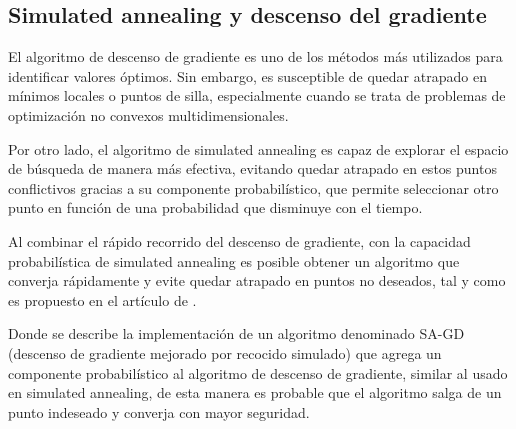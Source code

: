 \subsection{Simulated annealing y descenso del gradiente}

El algoritmo de descenso de gradiente es uno de los métodos más utilizados para identificar valores óptimos. Sin embargo, es susceptible de quedar atrapado en mínimos locales o puntos de silla, especialmente cuando se trata de problemas de optimización no convexos multidimensionales.

Por otro lado, el algoritmo de simulated annealing es capaz de explorar el espacio de búsqueda de manera más efectiva, evitando quedar atrapado en estos puntos conflictivos gracias a su componente probabilístico, que permite seleccionar otro punto en función de una probabilidad que disminuye con el tiempo. 

Al combinar el rápido recorrido del descenso de gradiente, con la capacidad probabilística de simulated annealing es posible obtener un algoritmo que converja rápidamente y evite quedar atrapado en puntos no deseados, tal y como es propuesto en el artículo de 
.


Donde se describe la implementación de un algoritmo denominado SA-GD (descenso de gradiente mejorado por recocido simulado) que agrega un componente probabilístico al algoritmo de descenso de gradiente, similar al usado en simulated annealing, de esta manera es probable que el algoritmo salga de un punto indeseado y converja con mayor seguridad.




